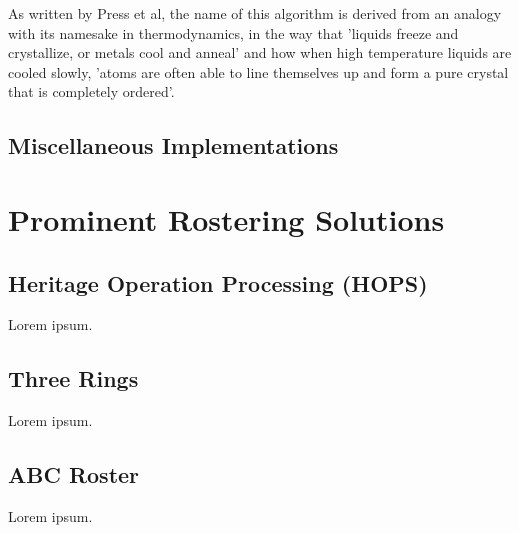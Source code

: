 As written by Press et al, the name of this algorithm is derived from an analogy with its namesake in thermodynamics, in the way that 'liquids freeze and crystallize, or metals cool and anneal' and how when high temperature liquids are cooled slowly, 'atoms are often able to line themselves up and form a pure crystal that is completely ordered'. \cite{Press:1992:NRC:148286}



\subsection{Miscellaneous Implementations}


\section{Prominent Rostering Solutions}



\subsection{Heritage Operation Processing (HOPS)}

Lorem ipsum.

\subsection{Three Rings}

Lorem ipsum.

\subsection{ABC Roster}

Lorem ipsum.